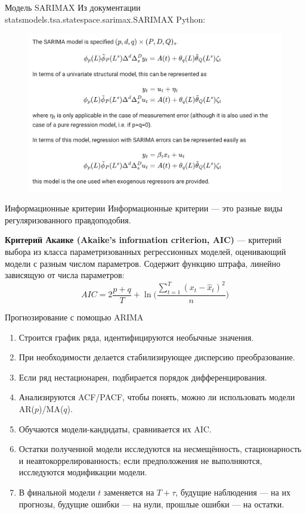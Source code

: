\begin{frame}{Модель SARIMAX}
Из документации statsmodels.tsa.statespace.sarimax.SARIMAX Python:
\begin{figure}
    \centering
    \includegraphics[width=0.75\linewidth]{lecture_2/fig/sarimax_tsa.png}
\end{figure}
\end{frame}
\begin{frame}{Информационные критерии}
Информационные критерии --- это разные виды регуляризованного правдоподобия.

\textbf{Критерий Акаике (Akaike's information criterion, AIC)} --- критерий выбора из класса параметризованных регрессионных моделей, оценивающий модели с разным числом параметров.
Содержит функцию штрафа, линейно зависящую от числа параметров:
\begin{equation*}
    AIC = 2\frac{p + q}{T} + \ln\Bigg(\frac{\sum_{t=1}^T (x_t - \hat{x}_t)^2}{n}\Bigg)
\end{equation*}

\end{frame}
\begin{frame}{Прогнозирование с помощью ARIMA}
\begin{enumerate}
    \item Строится график ряда, идентифицируются необычные значения.
    \item При необходимости делается стабилизирующее дисперсию
    преобразование.
    \item Если ряд нестационарен, подбирается порядок дифференцирования.
    \item Анализируются ACF/PACF, чтобы понять, можно ли использовать модели AR($p$)/MA($q$).
    \item Обучаются модели-кандидаты, сравнивается их AIC.
    \item Остатки полученной модели исследуются на несмещённость, стационарность и неавтокоррелированность; если предположения не выполняются, исследуются модификации модели.
    \item В финальной модели $t$ заменяется на $T + \tau$, будущие наблюдения — на их прогнозы, будущие ошибки — на нули, прошлые ошибки — на остатки.
\end{enumerate}
\end{frame}

